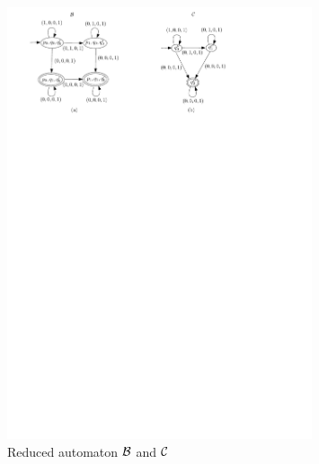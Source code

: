 \begin{figure}[ht]
\vspace{-3mm}
  \centering
  \includegraphics[width = 0.8\textwidth]{sections/overview-cefa-reduced.pdf}
  \caption{Reduced automaton $\mathcal{B}$ and $\mathcal{C}$}
  \label{fig:overview:product:reduced}
\vspace{-3mm}
\end{figure}


